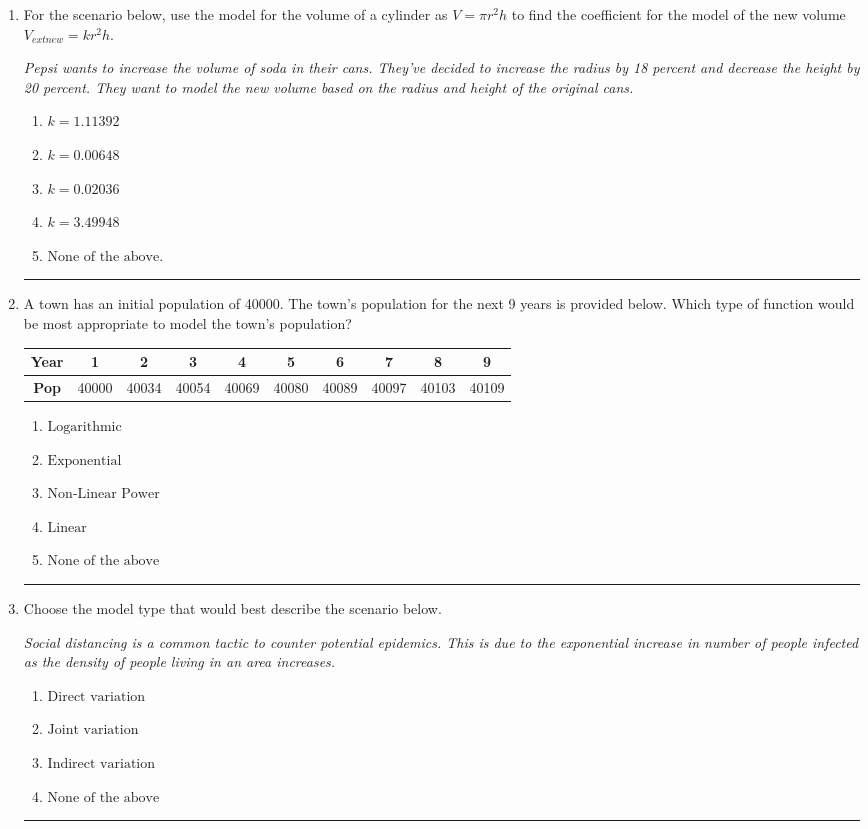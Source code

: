 \documentclass[14pt]{extbook}
\newcommand{\litem}[1]{\item#1\hspace*{-1cm}\rule{\textwidth}{0.4pt}}
\begin{document}
\begin{enumerate}
{\begin{enumerate}[label=\Alph*.]
\end{enumerate} }
\litem{
For the scenario below, use the model for the volume of a cylinder as $V = \pi r^2 h$ to find the coefficient for the model of the new volume $V_{	ext{new}} = k r^2 h$.
\begin{center}
    \textit{ Pepsi wants to increase the volume of soda in their cans. They've decided to increase the radius by 18 percent and decrease the height by 20 percent. They want to model the new volume based on the radius and height of the original cans. }
\end{center}
\begin{enumerate}[label=\Alph*.]
\item \( k = 1.11392 \)
\item \( k = 0.00648 \)
\item \( k = 0.02036 \)
\item \( k = 3.49948 \)
\item \( \text{None of the above.} \)

\end{enumerate} }
\litem{
A town has an initial population of 40000. The town's population for the next 9 years is provided below. Which type of function would be most appropriate to model the town's population?

\begin{tabular}{c|c|c|c|c|c|c|c|c|c}
\textbf{Year} &1 &2 &3 &4 &5 &6 &7 &8 &9\tabularnewline \hline
\textbf{Pop} &40000 &40034 &40054 &40069 &40080 &40089 &40097 &40103 &40109\end{tabular}\begin{enumerate}[label=\Alph*.]
\item \( \text{Logarithmic} \)
\item \( \text{Exponential} \)
\item \( \text{Non-Linear Power} \)
\item \( \text{Linear} \)
\item \( \text{None of the above} \)

\end{enumerate} }
\litem{
Choose the model type that would best describe the scenario below.
\begin{center}
    \textit{ Social distancing is a common tactic to counter potential epidemics. This is due to the exponential increase in number of people infected as the density of people living in an area increases. }
\end{center}
\begin{enumerate}[label=\Alph*.]
\item \( \text{Direct variation} \)
\item \( \text{Joint variation} \)
\item \( \text{Indirect variation} \)
\item \( \text{None of the above} \)


\end{enumerate}}
\end{enumerate}
\end{document}

